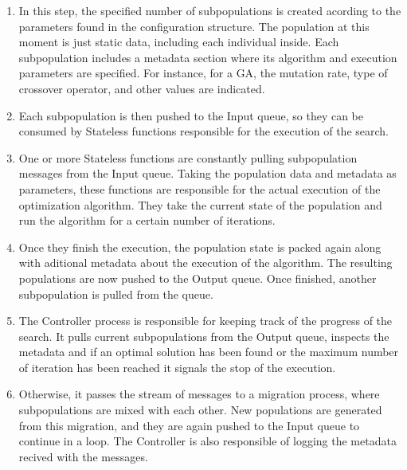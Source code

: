 \documentclass[review]{elsarticle}
\begin{document}
\begin{enumerate}
\item In this step, the specified number of subpopulations is created acording to the 
parameters found in the configuration structure. The population at this moment is just
static data, including each individual inside. Each subpopulation includes a metadata
section where its algorithm and execution parameters are specified. For instance, 
for a GA, the mutation rate, type of crossover operator, and other values are indicated.

\item Each subpopulation is then pushed to the Input queue, so they can be consumed 
by Stateless functions responsible for the execution of the search.  %

\item One or more Stateless functions are constantly pulling subpopulation messages
from the Input queue. Taking the population data and metadata as parameters, these 
functions are responsible for the actual execution of the optimization algorithm. 
They take the current state of the population and run the algorithm for a certain 
number of iterations. 

\item Once they finish the execution, the population state
is packed again along with aditional metadata about the execution of the algorithm.
The resulting populations are now pushed to the Output queue. Once finished, another 
subpopulation is pulled from the queue.

\item The Controller process is responsible for keeping track of the progress of 
the search. It pulls current subpopulations from the Output queue, inspects the metadata 
and if an optimal solution has been found or the maximum number of iteration has been
reached it signals the stop of the execution. 

\item Otherwise, it passes the stream of messages 
to a migration process, where subpopulations are mixed with each other. New populations 
are generated from this migration, and they are again pushed to the Input queue to continue 
in a loop. The Controller is also responsible of logging the metadata recived with the
messages.  
\end{enumerate}
\end{document}
